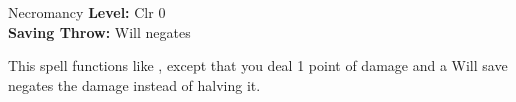 {Necromancy}
{
	\textbf{Level:}
	Clr 0\\
	\textbf{Saving Throw:}
	Will negates\\
}
{
	This spell functions like , except that you deal 1 point of damage and a Will save negates the damage instead of halving it.

}
